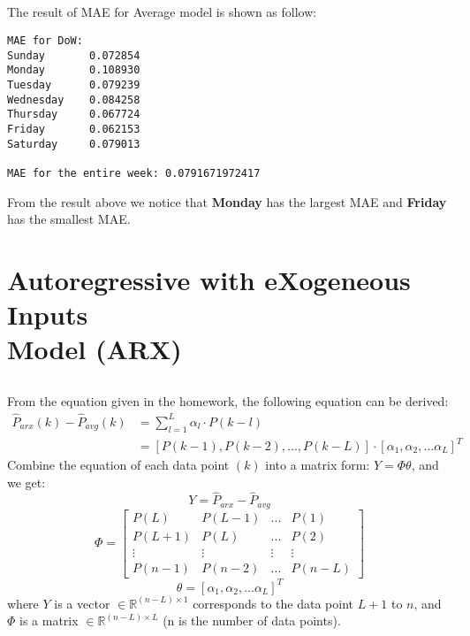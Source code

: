 \documentclass[12pt]{article}
\begin{document}
\subsection{}
The result of MAE for Average model is shown as follow:
\begin{verbatim}
MAE for DoW:
Sunday       0.072854
Monday       0.108930
Tuesday      0.079239
Wednesday    0.084258
Thursday     0.067724
Friday       0.062153
Saturday     0.079013

MAE for the entire week: 0.0791671972417
\end{verbatim}
From the result above we notice that \textbf{Monday} has the largest MAE and \textbf{Friday} has the smallest MAE.
\newpage
\section{Autoregressive with eXogeneous Inputs \\Model (ARX)}
\subsection{}
From the equation given in the homework, the following equation can be derived:
\begin{equation}
\begin{array}{ll}
\hat{P}_{arx}(k)-\hat{P}_{avg}(k)&=\sum_{l=1}^L\alpha_l\cdot P(k-l)\\
&=[P(k-1),P(k-2),...,P(k-L)]\cdot[\alpha_1,\alpha_2,...\alpha_L]^T
\end{array}
\end{equation}
Combine the equation of each data point $(k)$ into a matrix form: $Y=\Phi\theta$, and we get:
\begin{equation}
Y=\hat{P}_{arx}-\hat{P}_{avg}
\end{equation} 
\begin{equation}
\Phi = \left[
\begin{array}{cccc}
P(L)&P(L-1)&...&P(1)\\
P(L+1)&P(L)&...&P(2)\\
\vdots&\vdots&\vdots&\vdots\\
P(n-1)&P(n-2)&...&P(n-L)
\end{array}
\right]
\end{equation}
\begin{equation}
\theta=[\alpha_1,\alpha_2,...\alpha_L]^T
\end{equation}
where $Y$ is a vector $\in\mathbb{R}^{(n-L)\times1}$ corresponds to the data point $L+1$ to $n$, and $\Phi$ is a matrix $\in\mathbb{R}^{(n-L)\times L}$ (n is the number of data points).
\end{document}
